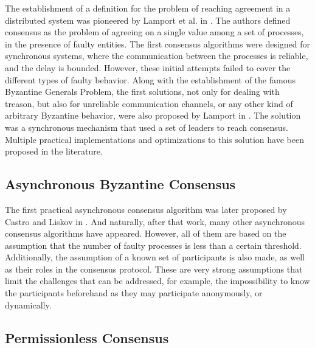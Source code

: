 \documentclass[journal]{IEEEtran}
\begin{document}
The establishment of a definition for the problem of reaching agreement in a distributed 
system was pioneered by Lamport et al. in \cite{pease1980reaching}. 
The authors defined consensus as the problem of agreeing on a single value among a set of processes, 
in the presence of faulty entities. The first consensus algorithms were designed for 
synchronous systems, where the communication between the processes is reliable, and the 
delay is bounded. However, these initial attempts failed to cover the different types of 
faulty behavior. Along with the establishment of the famous Byzantine Generals Problem, 
the first solutions, not only for dealing with treason, but also for unreliable communication 
channels, or any other kind of arbitrary Byzantine behavior, were 
also proposed by Lamport in \cite{lamport2019byzantine,lamport1983weak}. The solution was a synchronous 
mechanism that used a set of leaders to reach consensus. Multiple practical implementations 
and optimizations to this solution have been proposed in the literature. 

\subsection{Asynchronous Byzantine Consensus}

The first practical asynchronous consensus algorithm was later proposed by Castro and Liskov in \cite{castro1999practical}. 
And naturally, after that work, many other asynchronous consensus algorithms have appeared. 
However, all of them are based on the assumption that the number of faulty processes is less than 
a certain threshold. Additionally, the assumption of a known set of participants is also made, as well as their roles 
in the consensus protocol. These are very strong assumptions that limit the challenges that can be addressed, 
for example, the impossibility to know the participants beforehand as they may participate anonymously, or dynamically.

\subsection{Permissionless Consensus}
\end{document}
